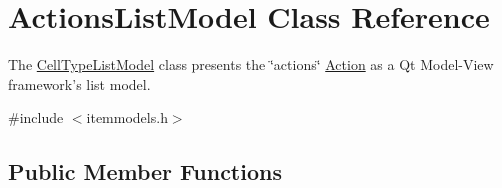 \hypertarget{class_actions_list_model}{\section{\-Actions\-List\-Model \-Class \-Reference}
\label{class_actions_list_model}
}


\-The \hyperlink{class_cell_type_list_model}{\-Cell\-Type\-List\-Model} class presents the \char`\"{}actions\char`\"{} \hyperlink{class_action}{\-Action} as a \-Qt \-Model-\/\-View framework's list model.  




{\ttfamily \#include $<$itemmodels.\-h$>$}

\subsection*{\-Public \-Member \-Functions}
